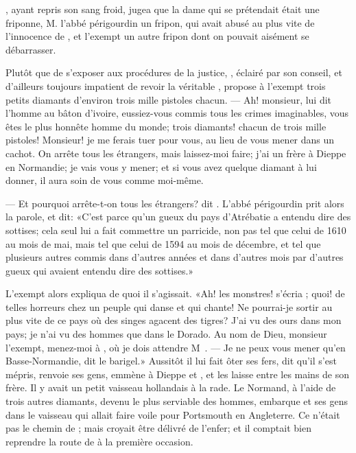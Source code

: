 , ayant repris son sang froid, jugea que la dame qui se
prétendait  était une friponne, M. l’abbé périgourdin un
fripon, qui avait abusé au plus vite de 
l'innocence
 de , et
l’exempt un autre fripon dont on pouvait aisément se débarrasser.


Plutôt que de s’exposer aux procédures de la justice, , éclairé
par son conseil, et d’ailleurs toujours impatient de revoir la
véritable , propose à l’exempt trois petits diamants d’environ
trois mille pistoles chacun. — Ah! monsieur, lui dit l’homme au bâton
d’ivoire, eussiez-vous commis tous les crimes imaginables, vous êtes le
plus honnête homme du monde; trois diamants! chacun de trois mille
pistoles! Monsieur! je me ferais tuer pour vous, au lieu de vous mener
dans un cachot. On arrête tous les étrangers, mais laissez-moi faire;
j’ai un frère à Dieppe en Normandie; je vais vous y mener; et si vous
avez quelque diamant à lui donner, il aura soin de vous comme moi-même.

— Et pourquoi arrête-t-on tous les étrangers? dit . L’abbé
périgourdin prit alors la parole, et dit: «C’est parce qu’un gueux du
pays d’Atrébatie a entendu dire des sottises; cela seul lui a fait
commettre un parricide, non pas tel que celui de 1610 au mois de
mai, mais tel que celui de 1594 au mois de décembre, et tel que
plusieurs autres commis dans d’autres années et dans d’autres mois par
d’autres gueux qui avaient entendu dire des sottises.»



L’exempt alors expliqua de quoi il s’agissait. «Ah! les monstres!
s’écria ; quoi! de telles horreurs chez un peuple qui danse et
qui chante! Ne pourrai-je sortir au plus vite de ce pays où des singes
agacent des tigres? J’ai vu des ours dans mon pays; je n’ai vu des
hommes que dans le Dorado. Au nom de Dieu, monsieur l’exempt, menez-moi
à  , où je dois attendre M~. — Je ne peux vous
mener qu’en Basse-Normandie, dit le barigel.» Aussitôt il lui fait
ôter ses fers, dit qu’il s’est mépris, renvoie ses gens, emmène à
Dieppe  et , et les laisse entre les mains de son frère.
Il y avait un petit vaisseau hollandais à la rade. Le Normand, à l’aide
de trois autres diamants, devenu le plus serviable des hommes, embarque
 et ses gens dans le vaisseau qui allait faire voile pour
Portsmouth en Angleterre. Ce n’était pas le chemin de  ; mais
 croyait être délivré de l’enfer; et il comptait bien reprendre
la route de   à la première occasion.





